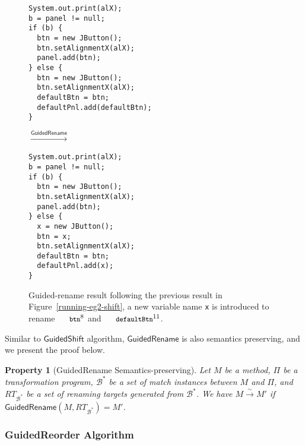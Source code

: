 \documentclass[a4paper, USenglish]{lipics-v2016}
\newenvironment{smpage}[1]
{\begin{lrbox}{\fmbox}\begin{minipage}{#1}}
{\end{minipage}\end{lrbox}\usebox{\fmbox}}
\newcommand{\code}[1]{\texttt{\footnotesize #1}}
\theoremstyle{plain}
\newtheorem{property}[theorem]{Property}
\begin{document}
\begin{figure}[ht]
\vspace{-5pt}
\begin{center}
\begin{smpage}{0.34\columnwidth}
\begin{lstlisting}[style=patl,frame=none,basicstyle=\ttfamily\scriptsize]
System.out.print(alX);
b = panel != null;
if (b) {
  btn = new JButton();
  btn.setAlignmentX(alX);
  panel.add(btn);
} else {
  btn = new JButton();
  btn.setAlignmentX(alX);
  defaultBtn = btn;
  defaultPnl.add(defaultBtn);
}
\end{lstlisting}
\end{smpage}
\!\!\!\!\!\!$\xrightarrow{\mathsf{GuidedRename}}$~~~~~
\begin{smpage}{0.4\columnwidth}
\begin{lstlisting}[style=patl,frame=none,basicstyle=\ttfamily\scriptsize]
System.out.print(alX);
b = panel != null;
if (b) {
  btn = new JButton();
  btn.setAlignmentX(alX);
  panel.add(btn);
} else {
  x = new JButton();
  btn = x;
  btn.setAlignmentX(alX);
  defaultBtn = btn;
  defaultPnl.add(x);
}
\end{lstlisting}
\end{smpage}
\end{center}
\vspace{-15pt}
\caption{Guided-rename result following the previous result in Figure~\ref{running-eg2-shift}, a new variable name \code{x} is introduced to rename $\code{btn}^8$ and $\code{defaultBtn}^{11}$.}
\label{running-eg2-rename}
\vspace{-10pt}
\end{figure}

Similar to $\mathsf{GuidedShift}$ algorithm, $\mathsf{GuidedRename}$ is also semantics preserving, and we present the proof below.
\begin{property}[GuidedRename Semantics-preserving]
  \label{property:guidedrename_semanticspreserving}
  Let $M$ be a method, $\Pi$ be a transformation program,
  $\mathcal{B}^*$ be a set of match instances between $M$ and $\Pi$, and
  $RT_{\mathcal{B}^*}$ be a set of renaming targets generated from $\mathcal{B}^*$. We have
  $M\xrightarrow{\sim} M'$ if $\mathsf{GuidedRename}(M,
\mathit{RT}_{\mathcal{B}^*})=M'$.
\end{property}

\subsubsection{GuidedReorder Algorithm}
\end{document}
